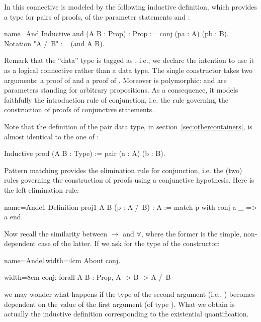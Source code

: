 In \Coq{} this connective is modeled by the following inductive
definition, which provides a type for pairs of proofs, of the
parameter statements  and :

\begin{coq}{name=And}{}
Inductive and (A B : Prop) : Prop := conj (pa : A) (pb : B).
Notation "A /\ B" := (and A B).
\end{coq}

Remark that the ``data'' type  is tagged as , i.e.,  we declare
the intention to use it as a logical connective rather than a data type.  The
single constructor  takes two
arguments: a proof of  and a proof of .
Moreover  is polymorphic:
 and  are parameters standing for arbitrary propositions.
As a consequence, it models faithfully the introduction rule of
conjunction, i.e. the rule governing the construction of proofs of
conjunctive statements.

Note that the definition of the pair data type,
in section~\ref{sec:othercontainers}, is almost identical to the one
of :

\begin{coq}{}{}
Inductive prod (A B : Type) := pair (a : A) (b : B).
\end{coq}

Pattern matching provides the elimination rule for
conjunction, i.e. the (two) rules governing the construction of proofs
using a conjunctive hypothesis. Here is the left elimination rule:

\begin{coq}{name=Ande1}{}
Definition proj1 A B (p : A /\ B) : A :=
  match p with conj a _ => a end.
\end{coq}

Now recall the similarity between $\to$ and $\forall$, where the former is the
simple, non-dependent case of the latter.  If we ask for the type of
the  constructor:

\begin{coq-left}{name=Ande1}{width=4cm}
About conj.
\end{coq-left}
\begin{coqout-right}{}{width=8cm}
conj: forall A B : Prop, A -> B -> A /\ B
\end{coqout-right}

we may wonder what happens if the type of the second argument (i.e., )
becomes dependent on the value of the first argument (of type ).
What we obtain is actually the inductive definition corresponding to the
existential quantification.

